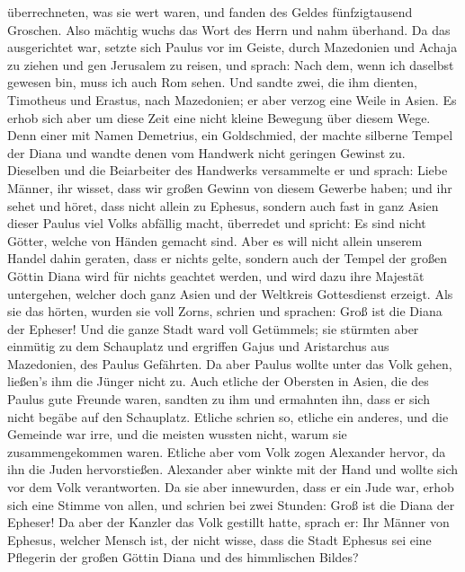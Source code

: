 überrechneten, was sie wert waren, und fanden des Geldes fünfzigtausend
Groschen.  Also mächtig wuchs das Wort des Herrn und nahm
überhand.  Da das ausgerichtet war, setzte sich Paulus vor
im Geiste, durch Mazedonien und Achaja zu ziehen und gen Jerusalem zu
reisen, und sprach: Nach dem, wenn ich daselbst gewesen bin, muss ich
auch Rom sehen.  Und sandte zwei, die ihm dienten,
Timotheus und Erastus, nach Mazedonien; er aber verzog eine Weile in
Asien.  Es erhob sich aber um diese Zeit eine nicht kleine
Bewegung über diesem Wege.  Denn einer mit Namen Demetrius,
ein Goldschmied, der machte silberne Tempel der Diana und wandte denen
vom Handwerk nicht geringen Gewinst zu.  Dieselben und die
Beiarbeiter des Handwerks versammelte er und sprach: Liebe Männer, ihr
wisset, dass wir großen Gewinn von diesem Gewerbe haben; 
und ihr sehet und höret, dass nicht allein zu Ephesus, sondern auch fast
in ganz Asien dieser Paulus viel Volks abfällig macht, überredet und
spricht: Es sind nicht Götter, welche von Händen gemacht sind.
 Aber es will nicht allein unserem Handel dahin geraten,
dass er nichts gelte, sondern auch der Tempel der großen Göttin Diana
wird für nichts geachtet werden, und wird dazu ihre Majestät untergehen,
welcher doch ganz Asien und der Weltkreis Gottesdienst erzeigt.
 Als sie das hörten, wurden sie voll Zorns, schrien und
sprachen: Groß ist die Diana der Epheser!  Und die ganze
Stadt ward voll Getümmels; sie stürmten aber einmütig zu dem Schauplatz
und ergriffen Gajus und Aristarchus aus Mazedonien, des Paulus
Gefährten.  Da aber Paulus wollte unter das Volk gehen,
ließen's ihm die Jünger nicht zu.  Auch etliche der
Obersten in Asien, die des Paulus gute Freunde waren, sandten zu ihm und
ermahnten ihn, dass er sich nicht begäbe auf den Schauplatz.
 Etliche schrien so, etliche ein anderes, und die Gemeinde
war irre, und die meisten wussten nicht, warum sie zusammengekommen
waren.  Etliche aber vom Volk zogen Alexander hervor, da
ihn die Juden hervorstießen. Alexander aber winkte mit der Hand und
wollte sich vor dem Volk verantworten.  Da sie aber
innewurden, dass er ein Jude war, erhob sich eine Stimme von allen, und
schrien bei zwei Stunden: Groß ist die Diana der Epheser! 
Da aber der Kanzler das Volk gestillt hatte, sprach er: Ihr Männer von
Ephesus, welcher Mensch ist, der nicht wisse, dass die Stadt Ephesus sei
eine Pflegerin der großen Göttin Diana und des himmlischen Bildes?
